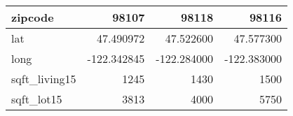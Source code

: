 \begin{table}[H]
\begin{tabular}{|l|r|r|r|}
\hline zipcode & \cellcolor[rgb]{0.9, 0.54, 0.52} 98107 & 98118 & 98116 \\
\hline lat & \cellcolor[rgb]{0.9, 0.54, 0.52} 47.490972 & 47.522600 & 47.577300 \\
\hline long & \cellcolor[rgb]{0.9, 0.54, 0.52} -122.342845 & \cellcolor[rgb]{0.9, 0.54, 0.52} -122.284000 & \cellcolor[rgb]{0.9, 0.54, 0.52} -122.383000 \\
\hline sqft\_living15 & \cellcolor[rgb]{0.9, 0.54, 0.52} 1245 & 1430 & 1500 \\
\hline sqft\_lot15 & \cellcolor[rgb]{0.9, 0.54, 0.52} 3813 & 4000 & 5750 \\
\hline
\end{tabular}
\end{table}
